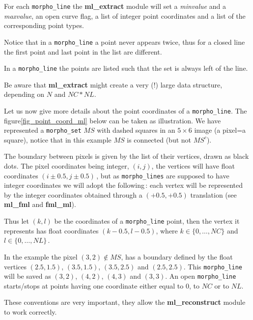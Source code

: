 For each {\tt morpho\_line} the {\bf ml\_extract} module will set
a {\em minvalue} and a {\em maxvalue}, an open curve flag, 
a list of integer point coordinates and a list 
of the corresponding point types.

\smallskip

Notice that in a {\tt morpho\_line} a point never appears twice, 
thus for a closed line the first point and last point 
in the list are different.

\smallskip

In a {\tt morpho\_line} the points are listed such that 
the set is always left of the line. 

\smallskip

Be aware that {\bf ml\_extract} might create a very (!) large
data structure, depending on $N$ and  $NC*NL$.

\bigskip

Let us now give more details about the point coordinates of a
{\tt morpho\_line}. The figure\ref{fig_point_coord_ml} below
 can be taken as illustration.
We have represented a {\tt morpho\_set} $MS$ with dashed squares
in an $5\times 6$ image (a pixel=a square), 
notice that in this example $MS$ is connected
(but not $MS^c$).

\medskip

The boundary between pixels is given by the list of their vertices,
drawn as black dots. The pixel coordinates being integer, $(i,j)$, the
vertices will have float coordinates $(i\pm 0.5 , j\pm 0.5)$\,,
but as {\tt morpho\_lines} are supposed to have integer coordinates
we will adopt the following\,: each vertex will be represented
by the integer coordinates obtained through a $(+0.5,+0.5)$
translation (see {\bf ml\_fml} and {\bf fml\_ml}).

\smallskip

Thus let $(k,l)$ be the coordinates  of a {\tt morpho\_line} point,
then the vertex it represents has float coordinates 
$(k-0.5 , l-0.5)$, where $k\in\{0,\ldots,NC\}$ and 
$l\in\{0,\ldots,NL\}$\,.

\smallskip

In the example the pixel $(3,2)\not\in MS$, has a boundary
defined by the float vertices $(2.5,1.5)$, $(3.5,1.5)$, 
$(3.5,2.5)$ and $(2.5,2.5)$. This {\tt morpho\_line}
will be saved as $(3,2)$, $(4,2)$, $(4,3)$ and $(3,3)$.
An open {\tt morpho\_line} starts/stops at points
having one coordinate either equal to 0, to $NC$ or to $NL$.

\medskip
These conventions are very important, they allow the
{\bf ml\_reconstruct} module to work correctly.

